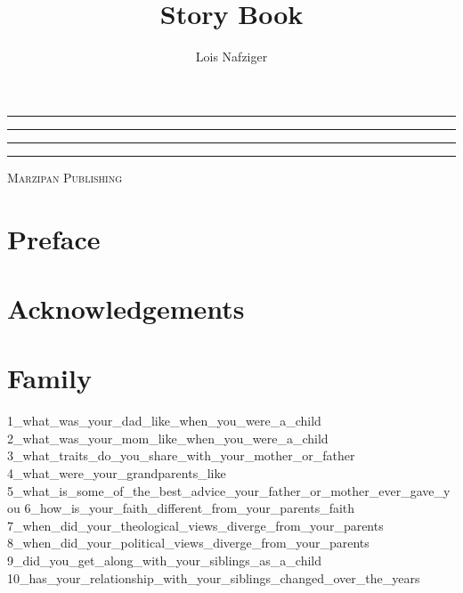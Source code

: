 \documentclass[smalldemyvopaper,11pt,twoside,onecolumn,openright,extrafontsizes]{memoir}
\title{Story Book}
\author{Lois Nafziger}
\newcommand{\press}{Marzipan Publishing}
\newcommand*\halftitlepage{\begingroup %
  \setlength\drop{0.1\textheight}
  \begin{center}
  \vspace*{\drop}
  \rule{\textwidth}{0in}\par
  {\Large\textsc\thetitle\par}
  \rule{\textwidth}{0in}\par
  \vfill
  \end{center}
\endgroup}
\newlength\drop
\newcommand*\titleM{\begingroup %
  \setlength\drop{0.15\textheight}
  \begin{center}
  \vspace*{\drop}
  \rule{\textwidth}{0in}\par
  {\HUGE\textsc\thetitle\par}
  \rule{\textwidth}{0in}\par
  {\Large\textit\theauthor\par}
  \vfill
  {\Large\scshape\press}
  \end{center}
\endgroup}
\begin{document}
\pagestyle{empty}
\halftitlepage
\cleardoublepage
\titleM
\clearpage

\begin{center}
\itshape{}
\end{center}

\frontmatter
\pagestyle{mystyle}
\chapter*{Preface}
\lipsum[1-2]
\chapter*{Acknowledgements}
\lipsum[1-2]
\clearpage
\tableofcontents*

\mainmatter

\chapter{Family}
{1_what_was_your_dad_like_when_you_were_a_child}
{2_what_was_your_mom_like_when_you_were_a_child}
{3_what_traits_do_you_share_with_your_mother_or_father}
{4_what_were_your_grandparents_like}
{5_what_is_some_of_the_best_advice_your_father_or_mother_ever_gave_you}
{6_how_is_your_faith_different_from_your_parents_faith}
{7_when_did_your_theological_views_diverge_from_your_parents}
{8_when_did_your_political_views_diverge_from_your_parents}
{9_did_you_get_along_with_your_siblings_as_a_child}
{10_has_your_relationship_with_your_siblings_changed_over_the_years}
\end{document}
